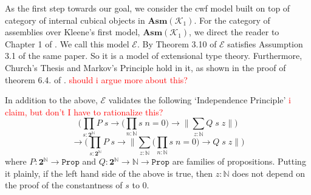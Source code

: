 \documentclass[12pt]{report}
\newcommand\todo[1]{\textcolor{red}{#1}}
\theoremstyle{definition}
\begin{document}
As the first step towards our goal, we consider the cwf model built on top of category of internal cubical objects in $\mathbf{Asm}(\mathcal{K}_1)$. 
For the category of assemblies over Kleene's first model, $\mathbf{Asm}(\mathcal{K}_1)$, we direct the reader to Chapter 1 of \cite{vanOosten:2008:RVI:1816956}. 
We call this model $\mathcal{E}$. 
By Theorem 3.10 of \cite{1905.03014} $\mathcal{E}$ satisfies Assumption 3.1 of the same paper. 
So it is a model of extensional type theory. 
Furthermore, Church's Thesis and Markov's Principle hold in it, as shown in the proof of theorem 6.4.  of \cite{1905.03014}. \todo{should i argue more about this?} 

In addition to the above, $\mathcal{E}$ validates the following `Independence Principle' \todo{i claim, but don't I have to rationalize this?}
$$\bigg( \prod_{s : \mathbf{2}^\mathbb{N}} P\; s \rightarrow \Big(\prod_{n : \mathbb{N}}s\; n = 0 \Big) \rightarrow \Big\lVert \sum_{z : \mathbb{N}} Q\; s\; z\Big\rVert \bigg)$$
$$\rightarrow \bigg( \prod_{s : \mathbf{2}^\mathbb{N}} P\; s \rightarrow  \Big\lVert \sum_{z:\mathbb{N}} \Big(\prod_{n : \mathbb{N}}s\; n = 0 \Big) \rightarrow Q \; s\;z\Big\rVert \bigg)$$
where $P: \mathbf{2}^\mathbb{N} \rightarrow \mathtt{Prop}$ and $Q : \mathbf{2}^\mathbb{N} \rightarrow \mathbb{N}\rightarrow \mathtt{Prop} $ are families of propositions. 
Putting it plainly, if the left hand side of the above is true, then $z : \mathbb{N}$ does not depend on the proof of the constantness of $s$ to $0$.
\end{document}
